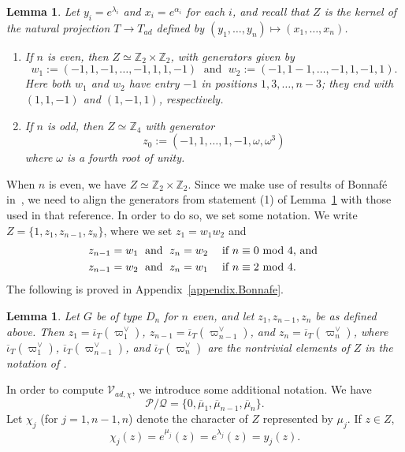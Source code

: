 \documentclass[reqno,11pt]{amsart}
\newtheorem{Lem}[Thm]{Lemma}
\theoremstyle{remark}
\theoremstyle{remark}
\theoremstyle{definition}
\theoremstyle{definition}
\theoremstyle{definition}
\numberwithin{equation}{section}
\newcommand{\Z}{\mathbb{ Z}}           %
\newcommand{\gl}{\lambda}
\newcommand{\cp}{\mathcal{P}}
\newcommand{\cq}{\mathcal{Q}}
\newcommand{\toric}{\mathcal{V}}
\def\ibarT{\overline{\iota}_T}
\begin{document}
\begin{Lem}\label{lem.ZintypeD} Let $y_i=e^{\lambda_i}$ and $x_i=e^{\alpha_i}$ for each $i$, and recall that $Z$ is the kernel of the natural projection $T \to T_{ad}$ defined by $(y_1, \ldots, y_n)\mapsto (x_1, \ldots, x_n)$. 
\begin{enumerate} 
\item If $n$ is even, then $Z\simeq \Z_2\times \Z_2$, with generators given by
\[
w_1 := (-1,1,-1, \ldots, -1,1,1,-1) \; \text{ and } \; w_2 := (-1,1 -1,\ldots, -1,1,-1,1).
\]
Here both $w_1$ and $w_2$ have entry $-1$ in positions $1,3, \ldots, n-3$; they end with $(1,1,-1)$ and $(1,-1,1)$, respectively.
\item If $n$ is odd, then $Z\simeq \Z_4$ with generator 
\[
z_0 := (-1,1,\ldots,1,-1,\omega,\omega^3) 
\]
where $\omega$ is a fourth root of unity.
\end{enumerate}
\end{Lem}



When $n$ is even, we have $Z\simeq \Z_2\times \Z_2$.  Since we make use of results of Bonnaf\'e in~\cite{Bonnafe2004}, we need
to align the generators from statement (1) of Lemma~\ref{lem.ZintypeD} with those used in that reference. In order to do so, we set some notation.
We write $Z=\{1, z_1, z_{n-1}, z_n\}$, where we set $z_1=w_1w_2$ and 
\begin{align*}
z_{n-1} &= w_1 \; \text{ and }\; z_{n}=w_2 \; \quad \text{if $n \equiv 0 \textup{ mod } 4$, and  }\\
z_{n-1} &= w_2 \; \text{ and }\; z_{n}=w_1 \; \quad \text{if $n \equiv 2 \textup{ mod } 4$.  }
\end{align*} 
The following is proved in Appendix~\ref{appendix.Bonnafe}.

\begin{Lem} \label{lem:Bonnafe}
Let $G$ be of type $D_n$ for $n$ even, and let $z_1, z_{n-1}, z_n$ be as defined above.  Then $z_1 = \ibarT(\varpi_1^{\vee})$,  $z_{n-1}=\ibarT(\varpi_{n-1}^{\vee})$, and  $z_{n}=\ibarT(\varpi_{n}^{\vee})$, where $\ibarT(\varpi_1^{\vee})$, $\ibarT(\varpi_{n-1}^{\vee})$, and  $\ibarT(\varpi_{n}^{\vee})$ are the nontrivial elements of $Z$ in the notation of \cite{Bonnafe2004}.
\end{Lem}



In order to compute $\toric_{ad, \chi}$, we introduce some additional notation. We have
$$
\cp/\cq = \{ 0, \overline{\mu}_1, \overline{\mu}_{n-1}, \overline{\mu}_n \}.
$$
Let $\chi_j$ (for $j = 1, n-1, n$) denote the character of $Z$ represented by $\mu_j$.  If $z \in Z$,
$$
\chi_j(z) = e^{\mu_j}(z) = e^{\gl_j}(z) = y_j(z).
$$
\end{document}
